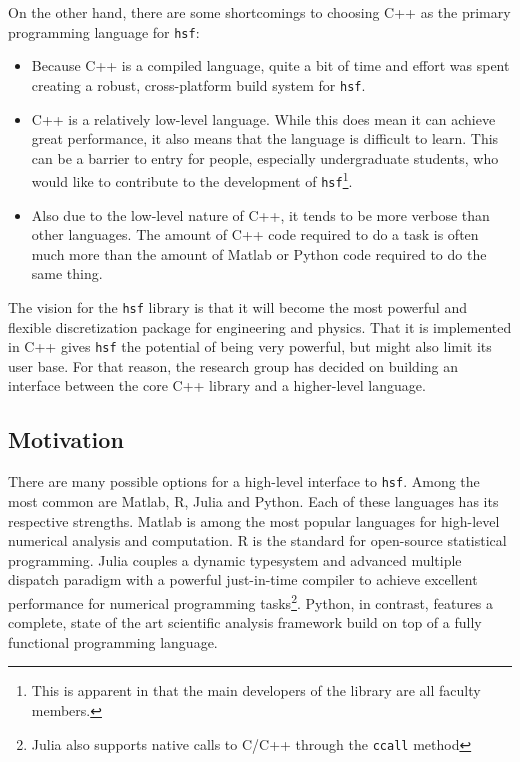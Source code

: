     On the other hand, there are some shortcomings to choosing C++ as the primary programming language for \texttt{hsf}:

    \begin{itemize}
      \item Because C++ is a compiled language, quite a bit of time and effort was spent creating a robust, cross-platform build system for \texttt{hsf}.
      \item  C++ is a relatively low-level language. While this does mean it can achieve great performance, it also means that the language is difficult to learn. This can be a barrier to entry for people, especially undergraduate students, who would like to contribute to the development of \texttt{hsf}\footnote{This is apparent in that the main developers of the library are all faculty members.}.
      \item Also due to the low-level nature of C++, it tends to be more verbose than other languages. The amount of C++ code required to do a task is often much more than the amount of Matlab or Python code required to do the same thing.
    \end{itemize}
    \mainstretch{}

    The vision for the \texttt{hsf} library is that it will become the most powerful and flexible discretization package for engineering and physics. That it is implemented in C++ gives \texttt{hsf} the potential of being very powerful, but might also limit its user base. For that reason, the research group has decided on building an interface between the core C++ library and a higher-level language.

  \subsection{Motivation} \label{ssec:motivation}

    There are many possible options for a high-level interface to \texttt{hsf}. Among the most common are Matlab, R, Julia and Python. Each of these languages has its respective strengths. Matlab is among the most popular languages for high-level numerical analysis and computation. R is the standard for open-source statistical programming. Julia couples a dynamic typesystem and advanced multiple dispatch paradigm with a powerful just-in-time compiler to achieve excellent performance for numerical programming tasks\footnote{Julia also supports native calls to C/C++ through the \texttt{ccall} method}. Python, in contrast, features a complete, state of the art scientific analysis framework build on top of a fully functional programming language.

